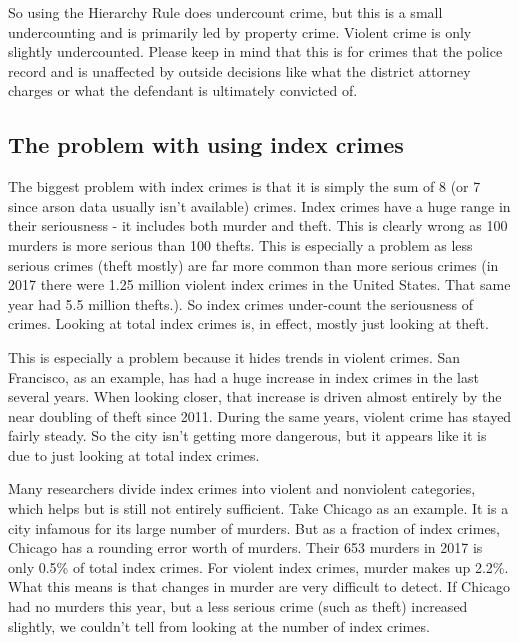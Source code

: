 \documentclass[
  12pt,
  openany]{book}
\begin{document}
So using the Hierarchy Rule does undercount crime, but this is a small undercounting and is primarily led by property crime. Violent crime is only slightly undercounted. Please keep in mind that this is for crimes that the police record and is unaffected by outside decisions like what the district attorney charges or what the defendant is ultimately convicted of.

\hypertarget{the-problem-with-using-index-crimes}{%
\subsection{The problem with using index crimes}\label{the-problem-with-using-index-crimes}}

The biggest problem with index crimes is that it is simply the sum of 8 (or 7 since arson data usually isn't available) crimes. Index crimes have a huge range in their seriousness - it includes both murder and theft. This is clearly wrong as 100 murders is more serious than 100 thefts. This is especially a problem as less serious crimes (theft mostly) are far more common than more serious crimes (in 2017 there were 1.25 million violent index crimes in the United States. That same year had 5.5 million thefts.). So index crimes under-count the seriousness of crimes. Looking at total index crimes is, in effect, mostly just looking at theft.

This is especially a problem because it hides trends in violent crimes. San Francisco, as an example, has had a huge increase in index crimes in the last several years. When looking closer, that increase is driven almost entirely by the near doubling of theft since 2011. During the same years, violent crime has stayed fairly steady. So the city isn't getting more dangerous, but it appears like it is due to just looking at total index crimes.

Many researchers divide index crimes into violent and nonviolent categories, which helps but is still not entirely sufficient. Take Chicago as an example. It is a city infamous for its large number of murders. But as a fraction of index crimes, Chicago has a rounding error worth of murders. Their 653 murders in 2017 is only 0.5\% of total index crimes. For violent index crimes, murder makes up 2.2\%. What this means is that changes in murder are very difficult to detect. If Chicago had no murders this year, but a less serious crime (such as theft) increased slightly, we couldn't tell from looking at the number of index crimes.
\end{document}
